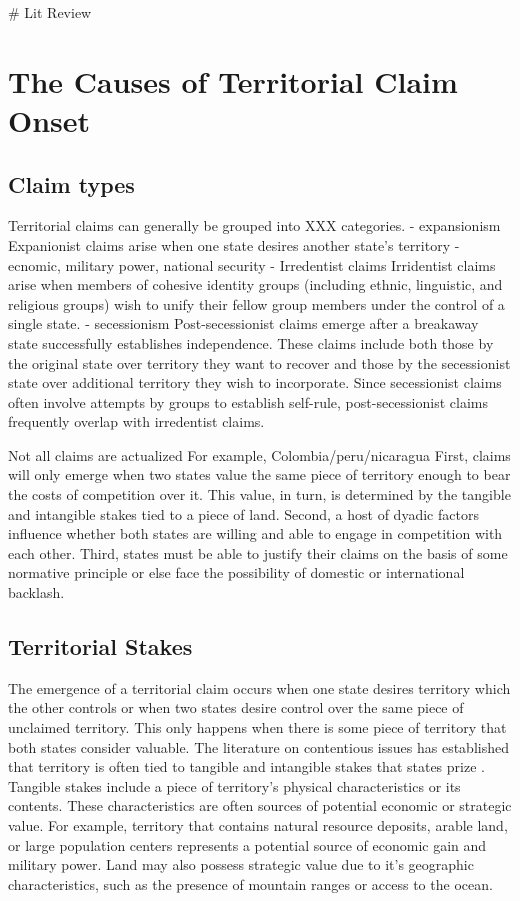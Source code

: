 # Lit Review
\section{The Causes of Territorial Claim Onset}


\subsection{Claim types}

Territorial claims can generally be grouped into XXX categories.
- expansionism
Expanionist claims arise when one state desires another state's territory  - ecnomic, military power, national security
- Irredentist claims 
Irridentist claims arise when members of cohesive identity groups (including ethnic, linguistic, and religious groups) wish to unify their fellow group members under the control of a single state.
- secessionism
Post-secessionist claims emerge after a breakaway state successfully establishes independence. These claims include both those by the original state over territory they want to recover and those by the secessionist state over additional territory they wish to incorporate. Since secessionist claims often involve attempts by groups to establish self-rule, post-secessionist claims frequently overlap with irredentist claims. 

Not all claims are actualized
For example, Colombia/peru/nicaragua
First, claims will only emerge when two states value the same piece of territory enough to bear the costs of competition over it. This value, in turn, is determined by the tangible and intangible stakes tied to a piece of land. Second, a host of dyadic factors influence whether both states are willing and able to engage in competition with each other. Third, states must be able to justify their claims on the basis of some normative principle or else face the possibility of domestic or international backlash.


\subsection{Territorial Stakes}

The emergence of a territorial claim occurs when one state desires territory which the other controls or when two states desire control over the same piece of unclaimed territory. This only happens when there is some piece of territory that both states consider valuable. The literature on contentious issues has established that territory is often tied to tangible and intangible stakes that states prize \citep[e.g., ][]{hensel2001, hensel2008, rosenau1971}. Tangible stakes include a piece of territory's physical characteristics or its contents. These characteristics are often sources of potential economic or strategic value. For example, territory that contains natural resource deposits, arable land, or large population centers represents a potential source of economic gain and military power. Land may also possess strategic value due to it's geographic characteristics, such as the presence of mountain ranges or access to the ocean.

